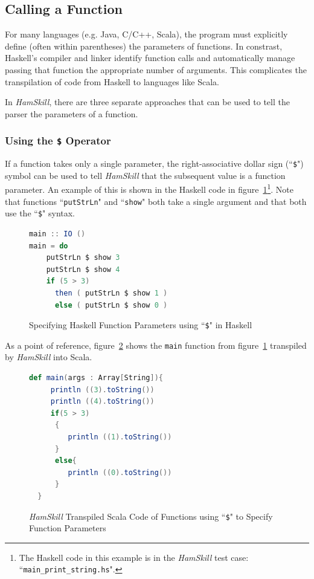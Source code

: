 \documentclass{report}
\begin{document}
\subsection{Calling a Function}\label{sec:callingAFunction}

For many languages (e.g. Java, C/C++, Scala), the program must explicitly define (often within parentheses) the parameters of functions.  In constrast, Haskell's compiler and linker identify function calls and automatically manage passing that function the appropriate number of arguments.  This complicates the transpilation of code from Haskell to languages like Scala.

In \textit{HamSkill}, there are three separate approaches that can be used to tell the parser the parameters of a function.

\subsubsection{Using the \texttt{\$} Operator}

If a function takes only a single parameter, the right-associative dollar sign (``\texttt{\$}") symbol can be used to tell \textit{HamSkill} that the subsequent value is a function parameter.  An example of this is shown in the Haskell code in figure~\ref{fig:useDollarSignHaskell}\footnote{The Haskell code in this example is in the \textit{HamSkill} test case: ``\texttt{main\_print\_string.hs}".}.  Note that functions ``\texttt{putStrLn}" and ``\texttt{show}" both take a single argument and that both use the ``\texttt{\$}" syntax.

\begin{figure}[H]
\begin{mdframed}
\begin{lstlisting}[basicstyle=\small, language=scala]
main :: IO ()
main = do
    putStrLn $ show 3 
    putStrLn $ show 4
    if (5 > 3) 
      then ( putStrLn $ show 1 ) 
      else ( putStrLn $ show 0 )
\end{lstlisting}
\end{mdframed}
\caption{Specifying Haskell Function Parameters using ``\texttt{\$}" in Haskell}\label{fig:useDollarSignHaskell}
\end{figure}

As a point of reference, figure~\ref{fig:useDollarSignScala} shows the \texttt{main} function from figure~\ref{fig:useDollarSignHaskell} transpiled by \textit{HamSkill} into Scala.

\begin{figure}[H]
\begin{mdframed}
\begin{lstlisting}[basicstyle=\small, language=scala]
  def main(args : Array[String]){
     println ((3).toString())
     println ((4).toString())
     if(5 > 3)
      {
         println ((1).toString())
      }
      else{
         println ((0).toString())
      }
  } 
\end{lstlisting}
\end{mdframed}
\caption{\textit{HamSkill} Transpiled Scala Code of Functions using ``\texttt{\$}" to Specify Function Parameters}\label{fig:useDollarSignScala}
\end{figure}
\end{document}
